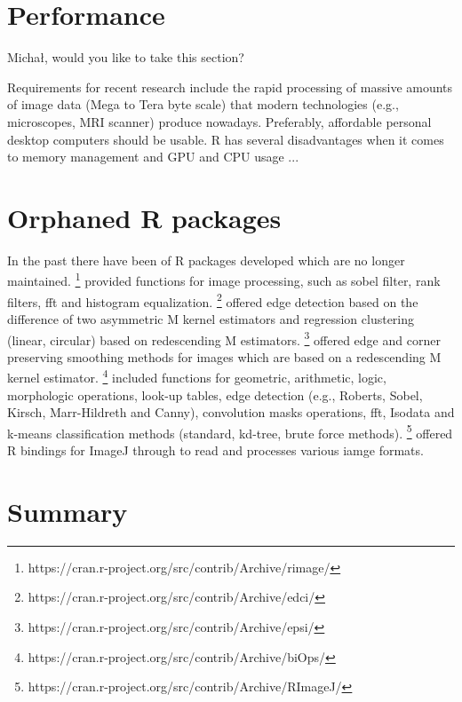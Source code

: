\section{Performance}

Micha\l{}, would you like to take this section?


Requirements for recent research include the rapid processing of massive amounts 
of image data (Mega to Tera byte scale) that modern technologies (e.g., 
microscopes, MRI scanner) produce nowadays. Preferably, affordable personal desktop
computers should be usable. R has several disadvantages when it comes to memory management
and GPU and CPU usage ...

\section{Orphaned R packages}

In the past there have been of R packages developed which are no longer 
maintained. 
\footnote{https://cran.r-project.org/src/contrib/Archive/rimage/ 
} provided functions for image processing, such as sobel filter, rank filters, 
fft and histogram equalization. 
\footnote{https://cran.r-project.org/src/contrib/Archive/edci/} 
offered edge detection based on the difference of two asymmetric M kernel 
estimators and regression clustering (linear, circular) based on redescending M 
estimators. 
\footnote{https://cran.r-project.org/src/contrib/Archive/epsi/} 
offered edge and corner preserving smoothing methods for images which are based 
on a redescending M kernel estimator. 
\footnote{https://cran.r-project.org/src/contrib/Archive/biOps/} 
included functions for geometric, arithmetic, logic, morphologic operations, 
look-up tables, edge detection (e.g., Roberts, Sobel, Kirsch, Marr-Hildreth and 
Canny), convolution masks operations, fft, Isodata and k-means classification methods 
(standard, kd-tree, brute force methods). \footnote{ 
https://cran.r-project.org/src/contrib/Archive/RImageJ/} offered R bindings for 
ImageJ through  to read and processes various iamge formats.

\section{Summary}

